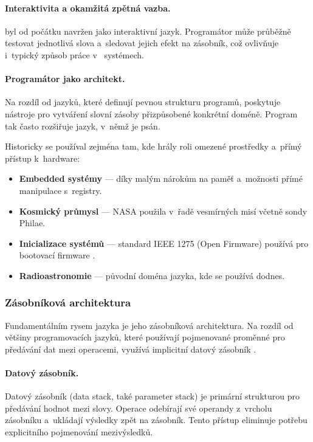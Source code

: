 \paragraph{Interaktivita a okamžitá zpětná vazba.}
\Forth{} byl od počátku navržen jako interaktivní jazyk. Programátor
může průběžně testovat jednotlivá slova a~sledovat jejich efekt
na zásobník, což ovlivňuje i~typický způsob práce v~\Forth{} systémech.

\paragraph{Programátor jako architekt.}
Na rozdíl od jazyků, které definují pevnou strukturu programů,
\Forth{} poskytuje nástroje pro vytváření slovní zásoby přizpůsobené
konkrétní doméně. Program tak často rozšiřuje jazyk, v~němž je psán.

Historicky se \Forth{} používal zejména tam, kde hrály roli omezené
prostředky a~přímý přístup k~hardware:

\begin{itemize}
	\item \textbf{Embedded systémy} --- díky malým nárokům na paměť
	      a~možnosti přímé manipulace s~registry.
	\item \textbf{Kosmický průmysl} --- NASA použila \Forth{} v~řadě
	      vesmírných misí včetně sondy Philae.
	\item \textbf{Inicializace systémů} --- standard IEEE 1275 (Open
	      Firmware) používá \Forth{} pro bootovací firmware
	      \autocite{open-firmware}.
	\item \textbf{Radioastronomie} --- původní doména jazyka, kde se
	      používá dodnes.
\end{itemize}


\subsubsection{Zásobníková architektura}
\label{sec:forth-zasobnik}

Fundamentálním rysem jazyka \Forth{} je jeho zásobníková architektura.
Na rozdíl od většiny programovacích jazyků, které používají pojmenované
proměnné pro předávání dat mezi operacemi, \Forth{} využívá implicitní
datový zásobník \autocite{koopman1989}.

\paragraph{Datový zásobník.}
Datový zásobník (data stack, také parameter stack) je primární
strukturou pro předávání hodnot mezi slovy. Operace odebírají
své operandy z~vrcholu zásobníku a~ukládají výsledky zpět na zásobník.
Tento přístup eliminuje potřebu explicitního pojmenování mezivýsledků.


